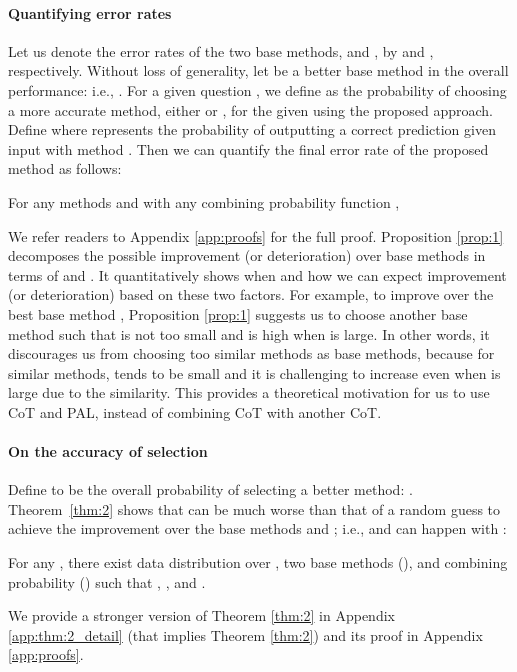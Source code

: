 \documentclass[11pt]{article}
\begin{document}
\paragraph{Quantifying error rates} Let us denote the error rates of the two base methods,  and , by  and , respectively. Without loss of generality, let  be a better base method in the overall performance: i.e., .
For a given question , we define  as the probability of choosing a more accurate method, either  or , for the given  using the proposed approach. 
Define  where  represents the probability of outputting a correct prediction given input  with method . Then we can quantify the final error rate  of the proposed method as follows:
\begin{proposition}  \label{prop:1}
For any methods  and  with any combining probability function , 

\end{proposition}
We refer readers to Appendix \ref{app:proofs} for the full proof. Proposition \ref{prop:1} decomposes the possible improvement (or deterioration) over base methods in terms of  and . It quantitatively shows when and how we can expect improvement (or deterioration) based on these two factors. For example, to improve over the best base method , Proposition \ref{prop:1} suggests us to choose another base method  such that  is not too small and  is high when  is large. In other words, it discourages us from choosing too similar methods as base methods, because for similar methods,  tends to be small and it is challenging to increase  even when  is large due to the similarity. This provides a theoretical motivation for us to use CoT and PAL, instead of combining CoT with another CoT.

\paragraph{On the accuracy of selection} Define  to be the overall probability of selecting a better method:  . Theorem~\ref{thm:2} shows that  can be much worse than that of a random guess to achieve the improvement over the base methods  and ; i.e.,  and  can happen with : 
\begin{theorem} \label{thm:2}
For any , there exist data distribution over , two base methods (), and combining probability () such  that   , , and .  
\end{theorem}
We provide a stronger version of Theorem \ref{thm:2} in Appendix \ref{app:thm:2_detail} (that implies Theorem \ref{thm:2}) and its proof in Appendix \ref{app:proofs}. 
\end{document}
